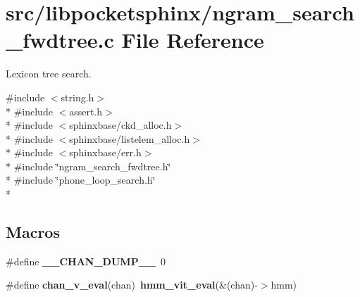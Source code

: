 \section{src/libpocketsphinx/ngram\-\_\-search\-\_\-fwdtree.c File Reference}
\label{ngram__search__fwdtree_8c}


Lexicon tree search.  


{\ttfamily \#include $<$string.\-h$>$}\\*
{\ttfamily \#include $<$assert.\-h$>$}\\*
{\ttfamily \#include $<$sphinxbase/ckd\-\_\-alloc.\-h$>$}\\*
{\ttfamily \#include $<$sphinxbase/listelem\-\_\-alloc.\-h$>$}\\*
{\ttfamily \#include $<$sphinxbase/err.\-h$>$}\\*
{\ttfamily \#include \char`\"{}ngram\-\_\-search\-\_\-fwdtree.\-h\char`\"{}}\\*
{\ttfamily \#include \char`\"{}phone\-\_\-loop\-\_\-search.\-h\char`\"{}}\\*
\subsection*{Macros}
\begin{DoxyCompactItemize}
\item 
\#define {\bfseries \-\_\-\-\_\-\-C\-H\-A\-N\-\_\-\-D\-U\-M\-P\-\_\-\-\_\-}~0\label{ngram__search__fwdtree_8c_a58360b0a332f35742f89edce94c649aa}

\item 
\#define {\bfseries chan\-\_\-v\-\_\-eval}(chan)~{\bf hmm\-\_\-vit\-\_\-eval}(\&(chan)-\/$>$hmm)\label{ngram__search__fwdtree_8c_a268c1fbc6483e1ab06c007222f08d9ad}

\end{DoxyCompactItemize}
